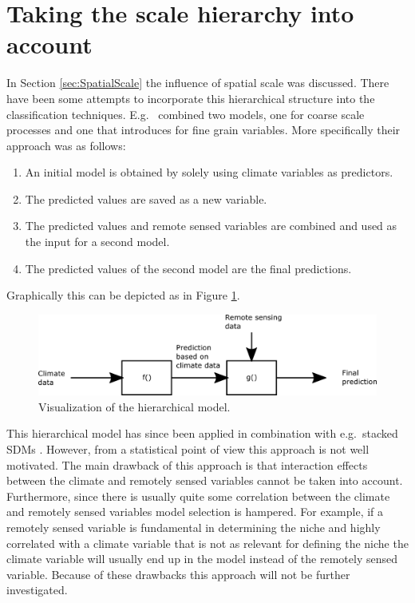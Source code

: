 \section{Taking the scale hierarchy into account}
\label{sec:TakingTheScaleHierarchyIntoAccount}
In Section \ref{sec:SpatialScale} the influence of spatial scale was discussed. There have been some attempts to incorporate this hierarchical structure into the classification techniques. E.g.\ \cite{pearson_modelling_2004} combined two models, one for coarse scale processes and one that introduces for fine grain variables. More specifically their approach was as follows: \\
\begin{enumerate}
\item An initial model is obtained by solely using climate variables as predictors.
\item The predicted values are saved as a new variable.
\item The predicted values and remote sensed variables are combined and used as the input for a second model.
\item The predicted values of the second model are the final predictions.
\end{enumerate}

Graphically this can be depicted as in Figure \ref{fig:chClassificationTechniques:HierarchicalClassification}.\\

\begin{figure}[!htb]
\centering
\includegraphics[scale=0.5]{VectorGraphics/HierarchicalClassification.png}
\caption{\label{fig:chClassificationTechniques:HierarchicalClassification}Visualization of the hierarchical model.}
\end{figure}

This hierarchical model has since been applied in combination with e.g.\ stacked SDMs \parencite{cord_remote_2014}. However, from a statistical point of view this approach is not well motivated. The main drawback of this approach is that interaction effects between the climate and remotely sensed variables cannot be taken into account. Furthermore, since there is usually quite some correlation between the climate and remotely sensed variables model selection is hampered. For example, if a remotely sensed variable is fundamental in determining the niche and highly correlated with a climate variable that is not as relevant for defining the niche the climate variable will usually end up in the model instead of the remotely sensed variable. Because of these drawbacks this approach will not be further investigated.







